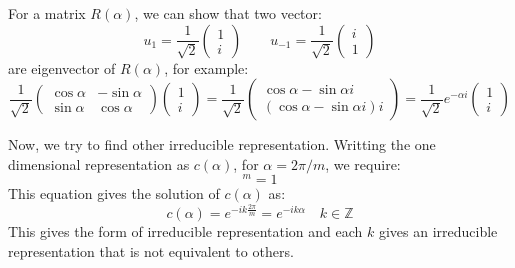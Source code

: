 \documentclass{amsart}
\theoremstyle{remark}
\theoremstyle{remark}
\theoremstyle{definition}
\begin{document}
For a matrix $R(\alpha)$, we can show that two vector:
\begin{equation*}
    u_1 = \frac{1}{\sqrt{2}}\left(\begin{matrix} 1 \\ i \end{matrix} \right) 
    \qquad u_{-1} = \frac{1}{\sqrt{2}}\left( \begin{matrix} i \\ 1 \end{matrix} \right)
\end{equation*}
are eigenvector of $R(\alpha)$, for example:
\begin{equation*}
    \frac{1}{\sqrt{2}} 
    \left(\begin{matrix}
        \cos\alpha & -\sin\alpha \\ \sin\alpha & \cos\alpha
    \end{matrix}\right)  \left(\begin{matrix} 1 \\ i \end{matrix} \right) 
     = \frac{1}{\sqrt{2}} 
     \left(\begin{matrix}
         \cos\alpha  -\sin\alpha i \\ (\cos\alpha -\sin\alpha i) i
     \end{matrix}\right)  
     = \frac{1}{\sqrt{2}} e^{-\alpha i} \left(\begin{matrix} 1 \\ i \end{matrix} \right) 
\end{equation*}

\vspace{10pt}

Now, we try to find other irreducible representation. Writting the one dimensional representation as
$c(\alpha)$, for $\alpha = 2\pi / m$, we require:
\begin{equation*}
    [c(\alpha)]^m = 1
\end{equation*}
This equation gives the solution of $c(\alpha)$ as:
\begin{equation*}
    c(\alpha) = e^{-ik\frac{2\pi}{m}} = e^{-ik\alpha} \quad k \in \mathbb{Z}
\end{equation*}
This gives the form of irreducible representation and each $k$ gives an 
irreducible representation that is not equivalent to others.

\vspace{10pt}
\end{document}
